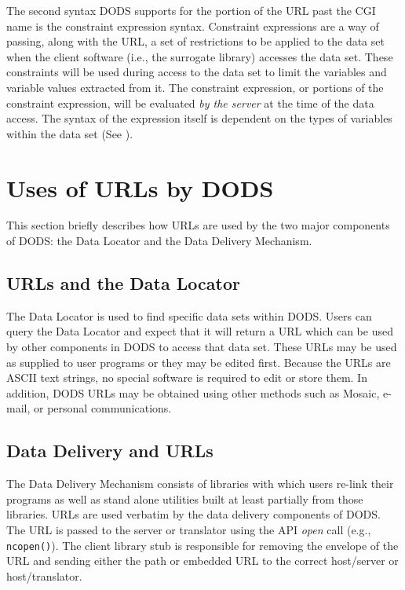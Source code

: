 The second syntax DODS supports for the portion of the URL past the CGI name
is the constraint expression syntax. Constraint expressions are a way of
passing, along with the URL, a set of restrictions to be applied to the data
set when the client software (i.e., the surrogate library) accesses the data
set. These constraints will be used during access to the data set to limit
the variables and variable values extracted from it. The constraint
expression, or portions of the constraint expression, will be evaluated {\em
  by the server\/} at the time of the data access. The syntax of the
expression itself is dependent on the types of variables within the data set
(See \DTP).

\section{Uses of URLs by DODS}

This section briefly describes how URLs are used by the two major components
of DODS: the Data Locator and the Data Delivery Mechanism.

\subsection{URLs and the Data Locator}
\label{url:locator}

The Data Locator is used to find specific data sets within DODS\@. Users can
query the Data Locator and expect that it will return a URL which can be used
by other components in DODS to access that data set. These URLs may be used
as supplied to user programs or they may be edited first. Because the URLs
are ASCII text strings, no special software is required to edit or store
them. In addition, DODS URLs may be obtained using other methods such as
Mosaic, e-mail, or personal communications.

\subsection{Data Delivery and URLs}
\label{delivery}
\label{urls:user-vs-generated}

The Data Delivery Mechanism consists of libraries with which users re-link
their programs as well as stand alone utilities built at least partially from
those libraries. URLs are used verbatim by the data delivery components of
DODS\@. The URL is passed to the server or translator using the API {\em
  open\/} call (e.g., {\tt ncopen()}). The client library stub is responsible
for removing the envelope of the URL and sending either the path or embedded
URL to the correct host/server or host/translator.


